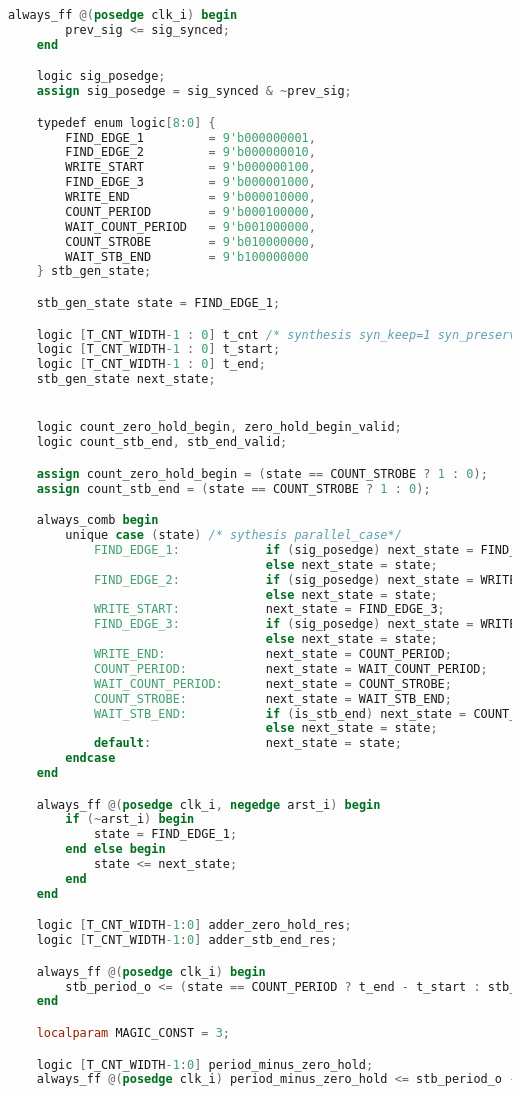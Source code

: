 \begin{lstlisting}[language=Verilog]
	always_ff @(posedge clk_i) begin
		prev_sig <= sig_synced;
	end

	logic sig_posedge;
	assign sig_posedge = sig_synced & ~prev_sig;

	typedef enum logic[8:0] { 
		FIND_EDGE_1 		= 9'b000000001, 
		FIND_EDGE_2 		= 9'b000000010,
		WRITE_START 		= 9'b000000100,
		FIND_EDGE_3 		= 9'b000001000, 
		WRITE_END			= 9'b000010000,
		COUNT_PERIOD 		= 9'b000100000, 
		WAIT_COUNT_PERIOD 	= 9'b001000000,
		COUNT_STROBE 		= 9'b010000000,
		WAIT_STB_END 		= 9'b100000000
	} stb_gen_state;

	stb_gen_state state = FIND_EDGE_1;

	logic [T_CNT_WIDTH-1 : 0] t_cnt /* synthesis syn_keep=1 syn_preserve=1 syn_ramstyle="registers" */;
	logic [T_CNT_WIDTH-1 : 0] t_start;
	logic [T_CNT_WIDTH-1 : 0] t_end;
	stb_gen_state next_state;


	logic count_zero_hold_begin, zero_hold_begin_valid;
	logic count_stb_end, stb_end_valid;

	assign count_zero_hold_begin = (state == COUNT_STROBE ? 1 : 0);
	assign count_stb_end = (state == COUNT_STROBE ? 1 : 0);

	always_comb begin
		unique case (state) /* sythesis parallel_case*/
			FIND_EDGE_1:			if (sig_posedge) next_state = FIND_EDGE_2;
									else next_state = state;
			FIND_EDGE_2:			if (sig_posedge) next_state = WRITE_START;
									else next_state = state;
			WRITE_START:			next_state = FIND_EDGE_3;
			FIND_EDGE_3:			if (sig_posedge) next_state = WRITE_END;
									else next_state = state;
			WRITE_END:				next_state = COUNT_PERIOD;
			COUNT_PERIOD:			next_state = WAIT_COUNT_PERIOD;
			WAIT_COUNT_PERIOD:		next_state = COUNT_STROBE;
			COUNT_STROBE:			next_state = WAIT_STB_END;
			WAIT_STB_END:			if (is_stb_end) next_state = COUNT_STROBE;
									else next_state = state;
			default:				next_state = state;
		endcase
	end

	always_ff @(posedge clk_i, negedge arst_i) begin
		if (~arst_i) begin
			state = FIND_EDGE_1;
		end else begin
			state <= next_state;
		end
	end

	logic [T_CNT_WIDTH-1:0] adder_zero_hold_res;
	logic [T_CNT_WIDTH-1:0] adder_stb_end_res;

	always_ff @(posedge clk_i) begin
		stb_period_o <= (state == COUNT_PERIOD ? t_end - t_start : stb_period_o);
	end

	localparam MAGIC_CONST = 3;

	logic [T_CNT_WIDTH-1:0] period_minus_zero_hold;
	always_ff @(posedge clk_i) period_minus_zero_hold <= stb_period_o - (ZERO_HOLD_CYCLES+MAGIC_CONST); //magic constat due to computation pipeline


\end{lstlisting}
